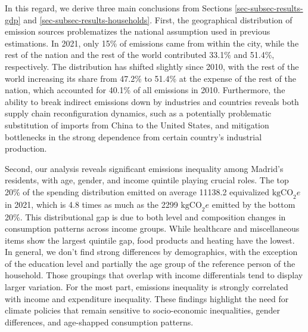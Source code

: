 \documentclass[
  10pt,
  twocolumn]{aft}
\begin{document}
In this regard, we derive three main conclusions from Sections
\ref{sec-subsec-results-gdp} and \ref{sec-subsec-results-households}.
First, the geographical distribution of emission sources problematizes
the national assumption used in previous estimations. In 2021, only 15\%
of emissions came from within the city, while the rest of the nation and
the rest of the world contributed 33.1\% and 51.4\%, respectively. The
distribution has shifted slightly since 2010, with the rest of the world
increasing its share from 47.2\% to 51.4\% at the expense of the rest of
the nation, which accounted for 40.1\% of all emissions in 2010.
Furthermore, the ability to break indirect emissions down by industries
and countries reveals both supply chain reconfiguration dynamics, such
as a potentially problematic substitution of imports from China to the
United States, and mitigation bottlenecks in the strong dependence from
certain country's industrial production.

Second, our analysis reveals significant emissions inequality among
Madrid's residents, with age, gender, and income quintile playing
crucial roles. The top 20\% of the spending distribution emitted on
average 11138.2 equivalized \(\text{kgCO}_2e\) in 2021, which is 4.8
times as much as the 2299 \(\text{kgCO}_2e\) emitted by the bottom 20\%.
This distributional gap is due to both level and composition changes in
consumption patterns across income groups. While healthcare and
miscellaneous items show the largest quintile gap, food products and
heating have the lowest. In general, we don't find strong differences by
demographics, with the exception of the education level and partially
the age group of the reference person of the household. Those groupings
that overlap with income differentials tend to display larger variation.
For the most part, emissions inequality is strongly correlated with
income and expenditure inequality. These findings highlight the need for
climate policies that remain sensitive to socio-economic inequalities,
gender differences, and age-shapped consumption patterns.
\end{document}
